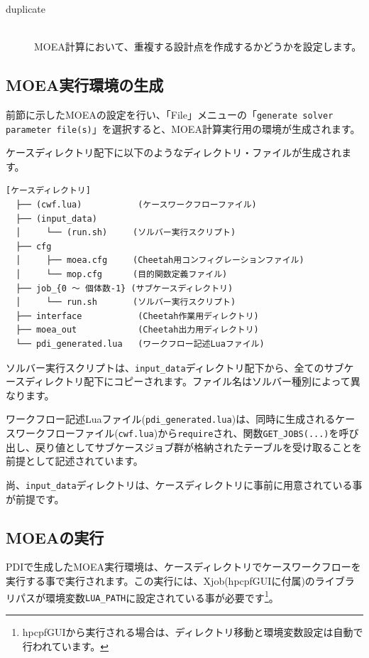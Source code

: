 \documentclass[a4paper,11pt]{jarticle}
\begin{document}
{\begin{description}
\item[duplicate] {\ }\\
MOEA計算において、重複する設計点を作成するかどうかを設定します。



\end{description}


\subsection{MOEA実行環境の生成}

前節に示したMOEAの設定を行い、「File」メニューの「{\tt generate solver parameter file(s)}」を選択すると、MOEA計算実行用の環境が生成されます。

ケースディレクトリ配下に以下のようなディレクトリ・ファイルが生成されます。

\begin{verbatim}
[ケースディレクトリ]
  ├── (cwf.lua)           (ケースワークフローファイル)
  ├── (input_data)
  │     └── (run.sh)     (ソルバー実行スクリプト)
  ├── cfg
  │     ├── moea.cfg     (Cheetah用コンフィグレーションファイル)
  │     └── mop.cfg      (目的関数定義ファイル)
  ├── job_{0 〜 個体数-1} (サブケースディレクトリ)
  │     └── run.sh       (ソルバー実行スクリプト)
  ├── interface           (Cheetah作業用ディレクトリ)
  ├── moea_out            (Cheetah出力用ディレクトリ)
  └── pdi_generated.lua   (ワークフロー記述Luaファイル)
\end{verbatim}

ソルバー実行スクリプトは、{\tt input\_data}ディレクトリ配下から、全てのサブケースディレクトリ配下にコピーされます。ファイル名はソルバー種別によって異なります。

ワークフロー記述Luaファイル({\tt pdi\_generated.lua})は、同時に生成されるケースワークフローファイル({\tt cwf.lua})から{\tt require}され、関数{\tt GET\_JOBS(...)}を呼び出し、戻り値としてサブケースジョブ群が格納されたテーブルを受け取ることを前提として記述されています。

尚、{\tt input\_data}ディレクトリは、ケースディレクトリに事前に用意されている事が前提です。


\subsection{MOEAの実行}

PDIで生成したMOEA実行環境は、ケースディレクトリでケースワークフローを実行する事で実行されます。この実行には、Xjob(hpcpfGUIに付属)のライブラリパスが環境変数{\tt LUA\_PATH}に設定されている事が必要です\footnote{hpcpfGUIから実行される場合は、ディレクトリ移動と環境変数設定は自動で行われています。}。

}
\end{document}
